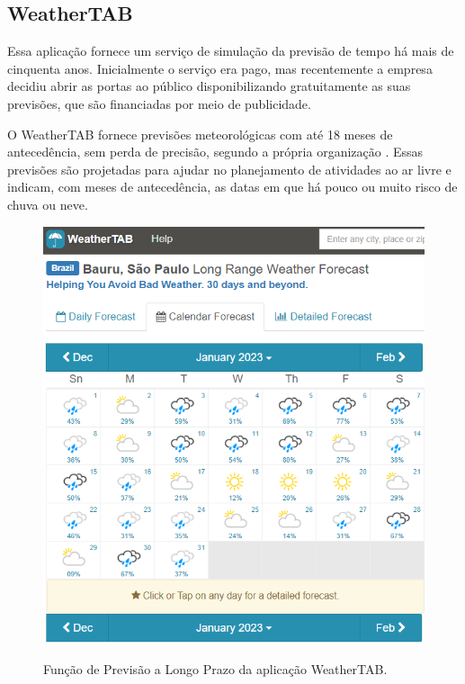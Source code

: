 \subsection{WeatherTAB}
\label{ss.weathertab}
Essa aplicação fornece um serviço de simulação da previsão de tempo há mais de cinquenta anos. Inicialmente o serviço era pago, mas recentemente a empresa decidiu abrir as portas ao público disponibilizando gratuitamente as suas previsões, que são financiadas por meio de publicidade.

O WeatherTAB fornece previsões meteorológicas com até 18 meses de antecedência, sem perda de precisão, segundo a própria organização \cite{weathertab}. Essas previsões são projetadas para ajudar no planejamento de atividades ao ar livre e indicam, com meses de antecedência, as datas em que há pouco ou muito risco de chuva ou neve.

\begin{figure}[H]
	\caption{\small Função de Previsão a Longo Prazo da aplicação WeatherTAB.}
	\centering
	\includegraphics[scale=0.75]{figs/wtab-forecast.png}
	\label{f.darksky-calendar}
\end{figure}